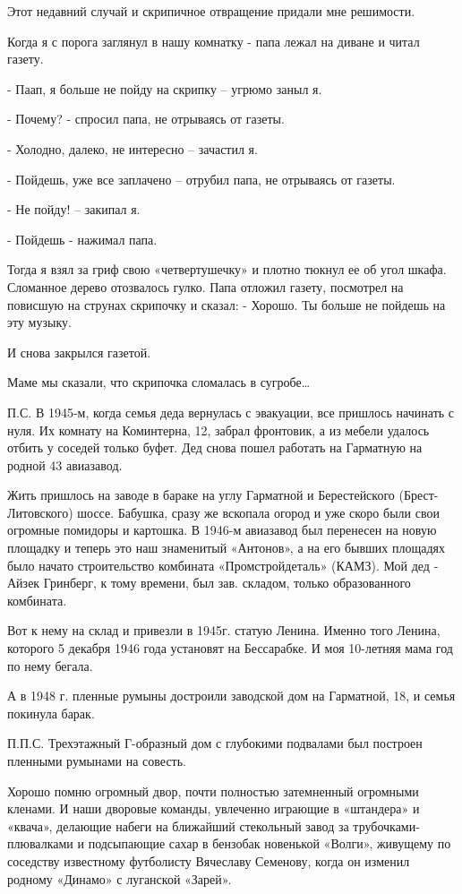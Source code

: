 Этот недавний случай и скрипичное отвращение придали мне решимости.

Когда я с порога заглянул в нашу комнатку - папа лежал на диване и читал газету.

- Паап, я больше не пойду на скрипку – угрюмо заныл я.

- Почему? - спросил папа, не отрываясь от газеты.

- Холодно, далеко, не интересно – зачастил я.

- Пойдешь, уже все заплачено – отрубил папа, не отрываясь от газеты.

- Не пойду! – закипал я.

- Пойдешь - нажимал папа.


Тогда я взял за гриф свою «четвертушечку» и плотно тюкнул ее об угол шкафа.
Сломанное дерево отозвалось гулко. Папа отложил газету, посмотрел на повисшую
на струнах скрипочку и сказал: - Хорошо. Ты больше не пойдешь на эту музыку. 

И снова закрылся газетой. 

Маме мы сказали, что скрипочка сломалась в сугробе…

П.С.  В 1945-м, когда семья деда вернулась с эвакуации, все пришлось начинать с
нуля. Их комнату на Коминтерна, 12, забрал фронтовик, а из мебели удалось
отбить у соседей только буфет. Дед снова пошел работать на Гарматную на родной
43 авиазавод.  

Жить пришлось на заводе в бараке на углу Гарматной и Берестейского
(Брест-Литовского) шоссе. Бабушка, сразу же вскопала огород и уже скоро были
свои огромные помидоры и картошка. В 1946-м авиазавод был перенесен на новую
площадку и теперь это наш знаменитый «Антонов», а на его бывших площадях было
начато строительство комбината «Промстройдеталь» (КАМЗ). Мой дед - Айзек
Гринберг, к тому времени, был зав. складом, только образованного комбината.

Вот к нему на склад и привезли в 1945г. статую Ленина. Именно того Ленина,
которого 5 декабря 1946 года   установят на Бессарабке. И моя 10-летняя мама
год по нему бегала. 

А в 1948 г. пленные румыны достроили заводской дом на Гарматной, 18, и семья
покинула барак. 

П.П.С. Трехэтажный Г-образный дом с глубокими подвалами был построен пленными
румынами на совесть. 

Хорошо помню огромный двор, почти полностью затемненный огромными кленами. И
наши дворовые команды, увлеченно играющие в «штандера» и «квача», делающие
набеги на ближайший стекольный завод за трубочками-плювалками и  подсыпающие
сахар в бензобак новенькой «Волги», живущему по соседству известному футболисту
Вячеславу Семенову, когда он изменил родному «Динамо» с луганской «Зарей».

